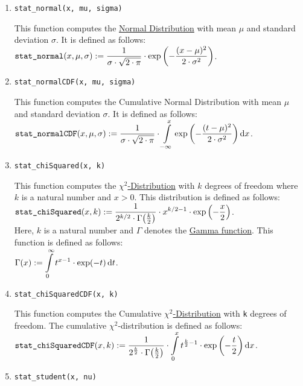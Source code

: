 	\begin{enumerate}
		\item \texttt{stat\_normal(x, mu, sigma)}

			This function computes the \href{https://en.wikipedia.org/wiki/Normal_distribution}{Normal Distribution} with mean $\mu$ and standard deviation
			$\sigma$.  It is defined as follows:
			\\[0.2cm]
			\hspace*{1.3cm}
			$\displaystyle \texttt{stat\_normal}(x, \mu, \sigma) :=
			\frac{1}{\sigma \cdot \sqrt{2 \cdot \pi}} \cdot \exp\left(-\frac{(x-\mu)^2}{2 \cdot \sigma^2}\right)
			$.
		\item \texttt{stat\_normalCDF(x, mu, sigma)}

			This function computes the Cumulative Normal Distribution with mean $\mu$ and standard deviation
			$\sigma$.  It is defined as follows:
			\\[0.2cm]
			\hspace*{1.3cm}
			$\displaystyle \texttt{stat\_normalCDF}(x, \mu, \sigma) :=
			\frac{1}{\sigma \cdot \sqrt{2 \cdot \pi}} \cdot 
			\int\limits_{-\infty}^x \exp\left(-\frac{(t-\mu)^2}{2 \cdot \sigma^2}\right) \mathrm{d}x
			$.
		\item \texttt{stat\_chiSquared(x, k)}
		 
			This function computes the
			\href{https://en.wikipedia.org/wiki/Chi-squared_distribution}{$\chi^2$-Distribution}
			with $k$ degrees of freedom where $k$ is a natural number and $x > 0$.
			This distribution is defined as follows:
			\\[0.2cm]
			\hspace*{1.3cm}
			$\displaystyle \texttt{stat\_chiSquared}(x, k) :=
			\frac{1}{2^{k/2} \cdot \Gamma\bigl(\frac{k}{2}\bigr)} \cdot x^{k/2 - 1} \cdot \exp\left(-\frac{x}{2}\right)
			$.
			\\[0.2cm]
			Here, $k$ is a natural number and $\Gamma$ denotes the \href{https://en.wikipedia.org/wiki/Gamma_function}{Gamma function}.
			This function is defined as follows:
			\\[0.2cm]
			\hspace*{1.3cm}
			$\displaystyle \Gamma(x) := \int\limits_0^{\infty} t^{x-1} \cdot \exp(-t)\, \mathrm{d}t$.
		\item \texttt{stat\_chiSquaredCDF(x, k)}
		 
			This function computes the Cumulative
			\href{https://en.wikipedia.org/wiki/Chi-squared_distribution}{$\chi^2$-Distribution}
			with \texttt{k} degrees of freedom.  The cumulative $\chi^2$-distribution is defined as follows:
			\\[0.2cm]
			\hspace*{1.3cm}
			$\displaystyle \texttt{stat\_chiSquaredCDF}(x, k) :=
			\frac{1}{2^{\frac{k}{2}} \cdot \Gamma\bigl(\frac{k}{2}\bigr)} \cdot 
			\int\limits_{0}^x t^{\frac{k}{2} - 1} \cdot \exp\left(-\frac{t}{2}\right) \mathrm{d}x
			$.
		\item \texttt{stat\_student(x, nu)}


\end{enumerate}
